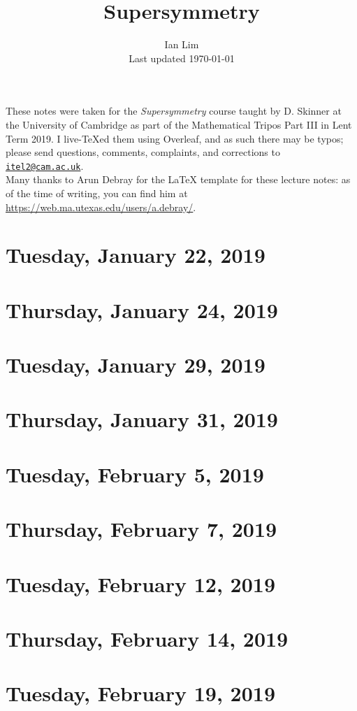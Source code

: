 \documentclass[reqno]{amsart}
\begin{document}
\title{Supersymmetry}
\author{Ian Lim\\ Last updated \today}
\maketitle
{\small\noindent These notes were taken for the \textit{Supersymmetry} course taught by D. Skinner at the University of Cambridge as part of the Mathematical Tripos Part III in Lent Term 2019. I live-\TeX ed them using Overleaf, and as such there may be typos; please send questions, comments, complaints, and corrections to 
\href{mailto:itel2@cam.ac.uk?subject=SUSY\%20Lecture\%20Notes}{\texttt{itel2@cam.ac.uk}}.\\
Many thanks to Arun Debray for the {\LaTeX} template for these lecture notes: as of the time of writing, you can find him at \url{https://web.ma.utexas.edu/users/a.debray/}.}

\tableofcontents

\section{Tuesday, January 22, 2019}
    

\section{Thursday, January 24, 2019}
    

\section{Tuesday, January 29, 2019}
    

\section{Thursday, January 31, 2019}
    

\section{Tuesday, February 5, 2019}
    

\section{Thursday, February 7, 2019}
    

\section{Tuesday, February 12, 2019}
    

\section{Thursday, February 14, 2019}
    

\section{Tuesday, February 19, 2019}
    
\end{document}
